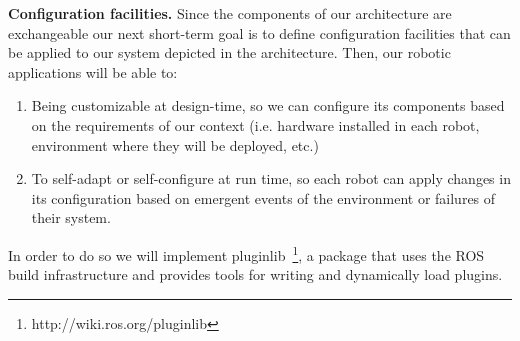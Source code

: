 \textbf{Configuration facilities.}
Since the components of our architecture are exchangeable our next short-term goal is to define configuration facilities that can be applied to our system depicted in the architecture.
Then, our robotic applications will be able to:

\begin{enumerate}
\item Being customizable at design-time, so we can configure its components based on the requirements of our context (i.e. hardware installed in each robot, environment where they will be deployed, etc.)
\item To self-adapt or self-configure at run time, so each robot can apply changes in its configuration based on emergent events of the environment or failures of their system.
\end{enumerate}

In order to do so we will implement pluginlib~\footnote{http://wiki.ros.org/pluginlib}, a package that uses the ROS build infrastructure and provides tools for writing and dynamically load plugins.




